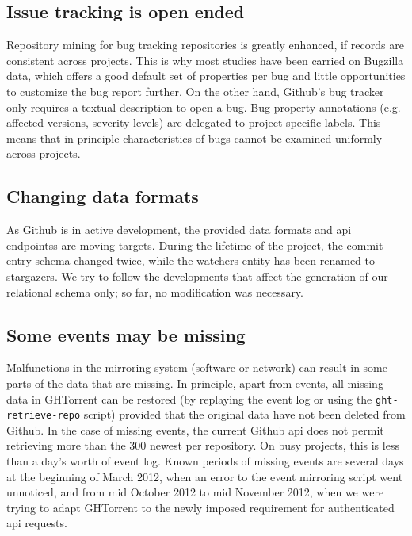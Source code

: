 \documentclass[conference]{IEEEtran}
\begin{document}
\subsection{Issue tracking is open ended} Repository mining for bug tracking
    repositories is greatly enhanced, if records are consistent across
    projects. This is why most studies have been carried on Bugzilla data, which
    offers a good default set of properties per bug and little opportunities to
    customize the bug report further. On the other hand, Github's bug tracker
    only requires a textual description to open a bug. Bug property annotations
    (e.g. affected versions, severity levels) are delegated to project specific
    labels. This means that in principle characteristics of bugs cannot be
    examined uniformly across projects.

\subsection{Changing data formats} As Github is in active development, the
provided data formats and {\sc api} endpointss are moving targets. During the
lifetime of the project, the commit entry schema changed twice, while the
\textsf{watchers} entity has been renamed to \textsf{stargazers}. We try to
follow the developments that affect the generation of our relational schema
only; so far, no modification was necessary.

\subsection{Some events may be missing} Malfunctions in the mirroring system
    (software or network) can result in some parts of the data that are missing.
    In principle, apart from events, all missing data in GHTorrent can be
    restored (by replaying the event log or using the \texttt{ght-retrieve-repo}
    script) provided that the original data have not been deleted from Github.
    In the case of missing events, the current Github {\sc api} does not permit
    retrieving more than the 300 newest per repository. On busy projects, this
    is less than a day's worth of event log. Known periods of missing events are
    several days at the beginning of March 2012, when an error to the event
    mirroring script went unnoticed, and from mid October 2012 to mid November
    2012, when we were trying to adapt GHTorrent to the newly imposed
    requirement for authenticated {\sc api} requests.
\end{document}
